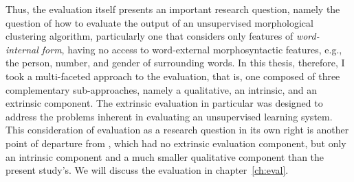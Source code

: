 Thus, the evaluation itself presents an important research question, namely the question of how to evaluate the output of an unsupervised morphological clustering algorithm, particularly one that considers only features of \emph{word-internal form}, having no access to word-external morphosyntactic features, e.g., the person, number, and gender of surrounding words. In this thesis, therefore, I took a multi-faceted approach to the evaluation, that is, one composed of three complementary sub-approaches, namely a qualitative, an intrinsic, and an extrinsic component. The extrinsic evaluation in particular was designed to address the problems inherent in evaluating an unsupervised learning system. This consideration of evaluation as a research question in its own right is another point of departure from \citet{meyer-and-dickinson:2016}, which had no extrinsic evaluation component, but only an intrinsic component and a much smaller qualitative component than the present study's. We will discuss the evaluation in chapter~\ref{ch:eval}.

%

